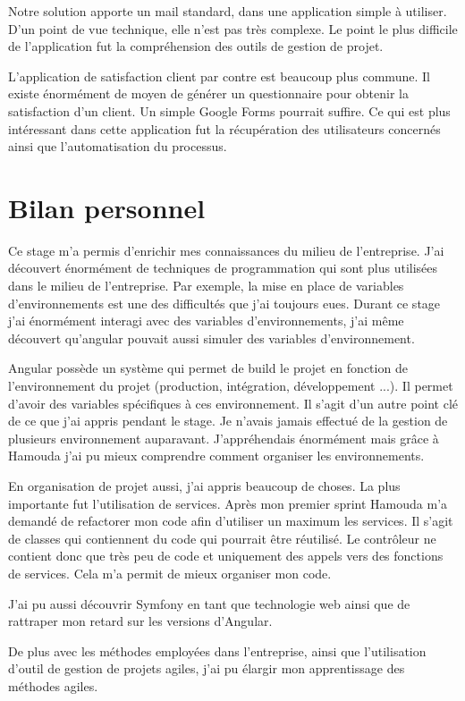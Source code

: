 \documentclass[12pt, twoside, openright]{report}
\begin{document}
Notre solution apporte un mail standard, dans une application simple à utiliser.  D'un point de vue technique, elle n'est pas très complexe. Le point le plus difficile de l'application fut la compréhension des outils de gestion de projet. 

L'application de satisfaction client par contre est beaucoup plus commune. Il existe énormément de moyen de générer un questionnaire pour obtenir la satisfaction d'un client. Un simple Google Forms pourrait suffire. Ce qui est plus intéressant dans cette application fut la récupération des utilisateurs concernés ainsi que l'automatisation du processus.

\section{Bilan personnel}

Ce stage m'a permis d'enrichir mes connaissances du milieu de l'entreprise. J'ai découvert énormément de techniques de programmation qui sont plus utilisées dans le milieu de l'entreprise. Par exemple, la mise en place de variables d'environnements est une des difficultés que j'ai toujours eues. Durant ce stage j'ai énormément interagi avec des variables d'environnements, j'ai même découvert qu'angular pouvait aussi simuler des variables d'environnement. 

Angular possède un système qui permet de build le projet en fonction de l'environnement du projet (production, intégration, développement ...). Il permet d'avoir des variables spécifiques à ces environnement. Il s'agit d'un autre point clé de ce que j'ai appris pendant le stage. Je n'avais jamais effectué de la gestion de plusieurs environnement auparavant. J'appréhendais énormément mais grâce à Hamouda j'ai pu mieux comprendre comment organiser les environnements. 

En organisation de projet aussi, j'ai appris beaucoup de choses. La plus importante fut l'utilisation de services. Après mon premier sprint Hamouda m'a demandé de refactorer mon code afin d'utiliser un maximum les services. Il s'agit de classes qui contiennent du code qui pourrait être réutilisé. Le contrôleur ne contient donc que très peu de code et uniquement des appels vers des fonctions de services. Cela m'a permit de mieux organiser mon code. 

J'ai pu aussi découvrir Symfony en tant que technologie web ainsi que de rattraper mon retard sur les versions d'Angular.

De plus avec les méthodes employées dans l'entreprise, ainsi que l'utilisation d'outil de gestion de projets agiles, j'ai pu élargir mon apprentissage des méthodes agiles.
\end{document}
